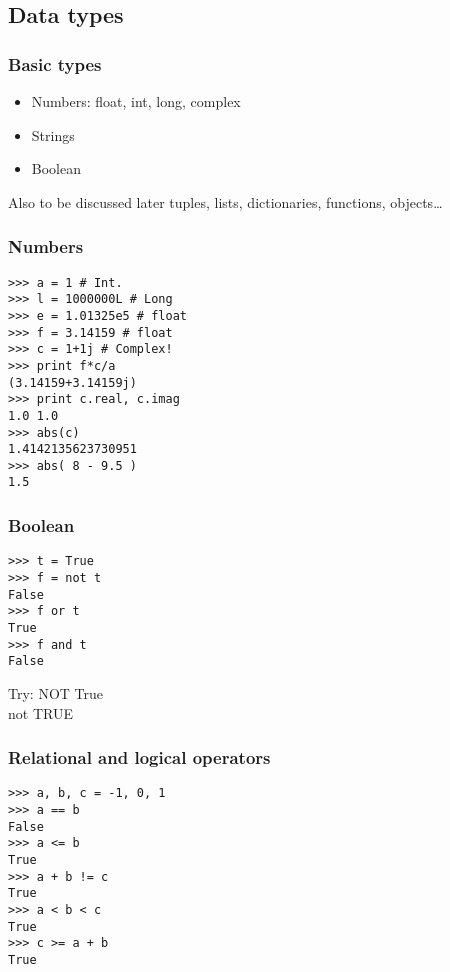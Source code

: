 \documentclass[14pt,compress]{beamer}
\begin{document}
\subsection{Data types}
\begin{frame}
  \frametitle{Basic types}
  \begin{itemize}
    \item Numbers: float, int, long, complex
    \item Strings
    \item Boolean
  \end{itemize}
  \begin{block}{Also to be discussed later}
    tuples, lists, dictionaries, functions, objects\ldots
  \end{block}
\end{frame}

\begin{frame}[fragile]
  \frametitle{Numbers}
  \vspace*{-0.25in}
  \begin{lstlisting}
>>> a = 1 # Int.
>>> l = 1000000L # Long
>>> e = 1.01325e5 # float
>>> f = 3.14159 # float
>>> c = 1+1j # Complex!
>>> print f*c/a
(3.14159+3.14159j)
>>> print c.real, c.imag
1.0 1.0
>>> abs(c)
1.4142135623730951
>>> abs( 8 - 9.5 )
1.5
  \end{lstlisting}
\end{frame}

\begin{frame}[fragile]
  \frametitle{Boolean}
  \begin{lstlisting}
>>> t = True
>>> f = not t
False
>>> f or t
True
>>> f and t
False
  \end{lstlisting}
  \begin{block}{Try:}
  NOT True\\
  not TRUE
  \end{block}
\end{frame}


\begin{frame}[fragile]
  \frametitle{Relational and logical operators}
  \begin{lstlisting}
>>> a, b, c = -1, 0, 1
>>> a == b
False
>>> a <= b 
True
>>> a + b != c
True
>>> a < b < c
True
>>> c >= a + b
True
  \end{lstlisting}
\end{frame}
\end{document}
